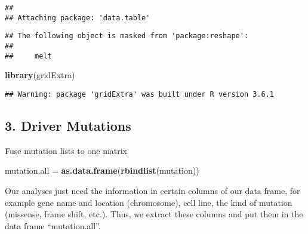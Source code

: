 \documentclass[]{article}
\newenvironment{Shaded}{\begin{snugshade}}{\end{snugshade}}
\newcommand{\KeywordTok}[1]{\textcolor[rgb]{0.13,0.29,0.53}{\textbf{#1}}}
\newcommand{\NormalTok}[1]{#1}
\newcommand{\OperatorTok}[1]{\textcolor[rgb]{0.81,0.36,0.00}{\textbf{#1}}}
\newcommand{\StringTok}[1]{\textcolor[rgb]{0.31,0.60,0.02}{#1}}
\begin{document}
\begin{verbatim}
## 
## Attaching package: 'data.table'
\end{verbatim}

\begin{verbatim}
## The following object is masked from 'package:reshape':
## 
##     melt
\end{verbatim}

\begin{Shaded}
\begin{Highlighting}[]
\KeywordTok{library}\NormalTok{(gridExtra)}
\end{Highlighting}
\end{Shaded}

\begin{verbatim}
## Warning: package 'gridExtra' was built under R version 3.6.1
\end{verbatim}

\hypertarget{driver-mutations}{%
\subsection{3. Driver Mutations}\label{driver-mutations}}

Fuse mutation lists to one matrix

\begin{Shaded}
\begin{Highlighting}[]
\NormalTok{mutation.all =}\StringTok{ }\KeywordTok{as.data.frame}\NormalTok{(}\KeywordTok{rbindlist}\NormalTok{(mutation))}
\end{Highlighting}
\end{Shaded}

Our analyses just need the information in certain columns of our data
frame, for example gene name and location (chromosome), cell line, the
kind of mutation (missense, frame shift, etc.). Thus, we extract these
columns and put them in the data frame ``mutation.all''.

\begin{Shaded}
\end{Shaded}
\end{document}
